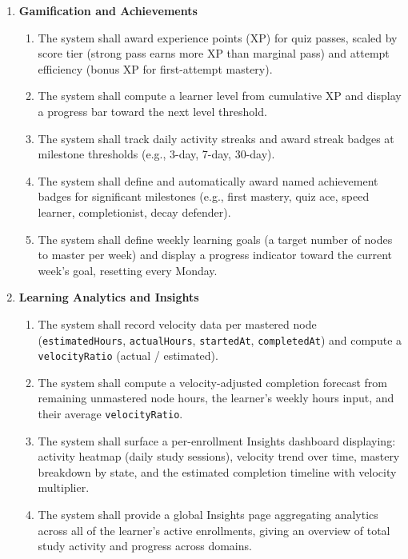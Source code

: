 \begin{enumerate}
    \item[\textbf{FR11:}] \textbf{Gamification and Achievements}
        \begin{enumerate}
            \item[\textbf{FR11.1:}] The system shall award experience points (XP) for quiz passes, scaled by score tier (strong pass earns more XP than marginal pass) and attempt efficiency (bonus XP for first-attempt mastery).
            \item[\textbf{FR11.2:}] The system shall compute a learner level from cumulative XP and display a progress bar toward the next level threshold.
            \item[\textbf{FR11.3:}] The system shall track daily activity streaks and award streak badges at milestone thresholds (e.g., 3-day, 7-day, 30-day).
            \item[\textbf{FR11.4:}] The system shall define and automatically award named achievement badges for significant milestones (e.g., first mastery, quiz ace, speed learner, completionist, decay defender).
            \item[\textbf{FR11.5:}] The system shall define weekly learning goals (a target number of nodes to master per week) and display a progress indicator toward the current week's goal, resetting every Monday.
        \end{enumerate}

    \item[\textbf{FR12:}] \textbf{Learning Analytics and Insights}
        \begin{enumerate}
            \item[\textbf{FR12.1:}] The system shall record velocity data per mastered node (\texttt{estimatedHours}, \texttt{actualHours}, \texttt{startedAt}, \texttt{completedAt}) and compute a \texttt{velocityRatio} (actual / estimated).
            \item[\textbf{FR12.2:}] The system shall compute a velocity-adjusted completion forecast from remaining unmastered node hours, the learner's weekly hours input, and their average \texttt{velocityRatio}.
            \item[\textbf{FR12.3:}] The system shall surface a per-enrollment Insights dashboard displaying: activity heatmap (daily study sessions), velocity trend over time, mastery breakdown by state, and the estimated completion timeline with velocity multiplier.
            \item[\textbf{FR12.4:}] The system shall provide a global Insights page aggregating analytics across all of the learner's active enrollments, giving an overview of total study activity and progress across domains.
        \end{enumerate}


\end{enumerate}
